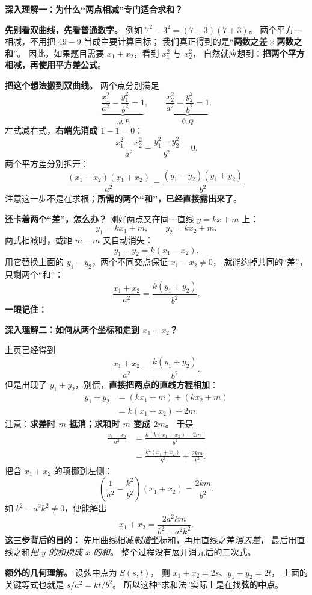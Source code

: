 \begin{explanationbox}
\textbf{深入理解一：为什么“两点相减”专门适合求和？}

\textbf{先别看双曲线，先看普通数字。}
例如 $7^2-3^2=(7-3)(7+3)$。
两个平方一相减，不用把 $49-9$ 当成主要计算目标；
我们真正得到的是“\textbf{两数之差}\,$\times$\,\textbf{两数之和}”。
因此，如果题目需要 $x_1+x_2$，看到 $x_1^2$ 与 $x_2^2$，
自然就应想到：\textbf{把两个平方相减，再使用平方差公式}。

\textbf{把这个想法搬到双曲线。} 两个点分别满足
\[
\underbrace{\frac{x_1^2}{a^2}-\frac{y_1^2}{b^2}=1}_{\text{点 }P},
\qquad
\underbrace{\frac{x_2^2}{a^2}-\frac{y_2^2}{b^2}=1}_{\text{点 }Q}.
\]
左式减右式，\textbf{右端先消成 $1-1=0$}：
\[
\frac{x_1^2-x_2^2}{a^2}-\frac{y_1^2-y_2^2}{b^2}=0.
\]
两个平方差分别拆开：
\[
\boxed{\frac{(x_1-x_2)(x_1+x_2)}{a^2}
=\frac{(y_1-y_2)(y_1+y_2)}{b^2}}.
\]
注意这一步不是在求根；\textbf{所需的两个“和”，已经直接露出来了}。

\textbf{还卡着两个“差”，怎么办？} 刚好两点又在同一直线
$y=kx+m$ 上：
\[
 y_1=kx_1+m,\qquad y_2=kx_2+m.
\]
两式相减时，截距 $m-m$ 又自动消失：
\[
 \boxed{y_1-y_2=k(x_1-x_2)}.
\]
用它替换上面的 $y_1-y_2$，两个不同交点保证 $x_1-x_2\ne0$，
就能约掉共同的“差”，只剩两个“和”：
\[
 \boxed{\frac{x_1+x_2}{a^2}=\frac{k(y_1+y_2)}{b^2}}.
\]
\textbf{一眼记住：} 
\end{explanationbox}
\clearpage

\begin{explanationbox}
\textbf{深入理解二：如何从两个坐标和走到 $x_1+x_2$？}

上页已经得到
\[
 \frac{x_1+x_2}{a^2}=\frac{k(y_1+y_2)}{b^2}.
\]
但是出现了 $y_1+y_2$，别慌，\textbf{直接把两点的直线方程相加}：
\[
\begin{aligned}
 y_1+y_2
 &= (kx_1+m)+(kx_2+m)\\
 &=k(x_1+x_2)+2m.
\end{aligned}
\]
注意：\textbf{求差时 $m$ 抵消；求和时 $m$ 变成 $2m$}。
于是
\[
\begin{aligned}
 \frac{x_1+x_2}{a^2}
 &=\frac{k\,[k(x_1+x_2)+2m]}{b^2}\\
 &=\frac{k^2(x_1+x_2)}{b^2}+\frac{2km}{b^2}.
\end{aligned}
\]
把含 $x_1+x_2$ 的项挪到左侧：
\[
 \boxed{\left(\frac1{a^2}-\frac{k^2}{b^2}\right)
 (x_1+x_2)=\frac{2km}{b^2}}.
\]
如 $b^2-a^2k^2\ne0$，便能解出
\[
 \boxed{x_1+x_2=\frac{2a^2km}{b^2-a^2k^2}}.
\]
\textbf{这三步背后的目的：}
先用曲线相减\emph{制造}坐标和，再用直线之差\emph{消去差}，
最后用直线之和\emph{把 $y$ 的和换成 $x$ 的和}。
整个过程没有展开消元后的二次式。

\textbf{额外的几何理解。} 设弦中点为 $S(s,t)$，
则 $x_1+x_2=2s$、$y_1+y_2=2t$，
上面的关键等式也就是 $s/a^2=kt/b^2$。
所以这种“求和法”实际上是在找\textbf{弦的中点}。
\end{explanationbox}
\clearpage

